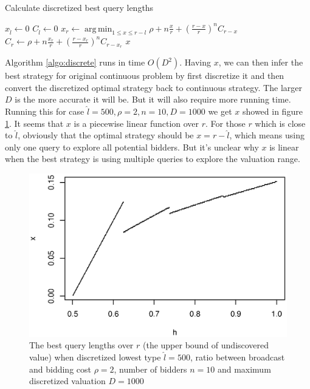 \begin{algorithm}
    \caption{Calculate discretized best query lengths}\label{algo:discrete}
    \begin{algorithmic}[1]
        
            \State $x_{\hat l} \gets 0$
            \State $C_{\hat l} \gets 0$
                \State $x_r \gets \displaystyle \operatorname*{arg\,min}_{1 \leq x \leq r-l} \rho + n \frac{x}{r} + (\frac{r-x}{r})^n C_{r-x}$
                \State $C_r \gets \rho + n \frac{x_r}{r} + (\frac{r-x_r}{r})^n C_{r-x_r}$
            \EndFor
            \State \Return $x$
        \EndFunction
    \end{algorithmic}
\end{algorithm}

Algorithm \ref{algo:discrete} runs in time $O(D^2)$. Having $x$, we can then
infer the best strategy for original continuous problem by first discretize it
and then convert the discretized optimal strategy back to continuous strategy.
The larger $D$ is the more accurate it will be. But it will also require more
running time.  Running this for case $\hat l = 500, \rho = 2, n = 10, D = 1000$
we get $x$ showed in figure \ref{fig:x-r}. It seems that $x$ is a piecewise
linear function over $r$.  For those $r$ which is close to $\hat l$, obviously
that the optimal strategy should be $x = r-\hat l$, which means using only one
query to explore all potential bidders. But it's unclear why $x$ is linear when
the best strategy is using multiple queries to explore the valuation range.

\begin{figure}
\centering
    \includegraphics[trim=0mm 5mm 5mm 15mm, clip, width=\linewidth]{figures/1000-500-2-1-10}
    \caption{The best query lengths over $r$ (the upper bound of
        undiscovered value) when discretized lowest type $\hat l = 500$,
        ratio between broadcast and bidding cost $\rho = 2$,
        number of bidders $n = 10$ and maximum discretized valuation
        $D = 1000$}\label{fig:x-r}
\end{figure}

